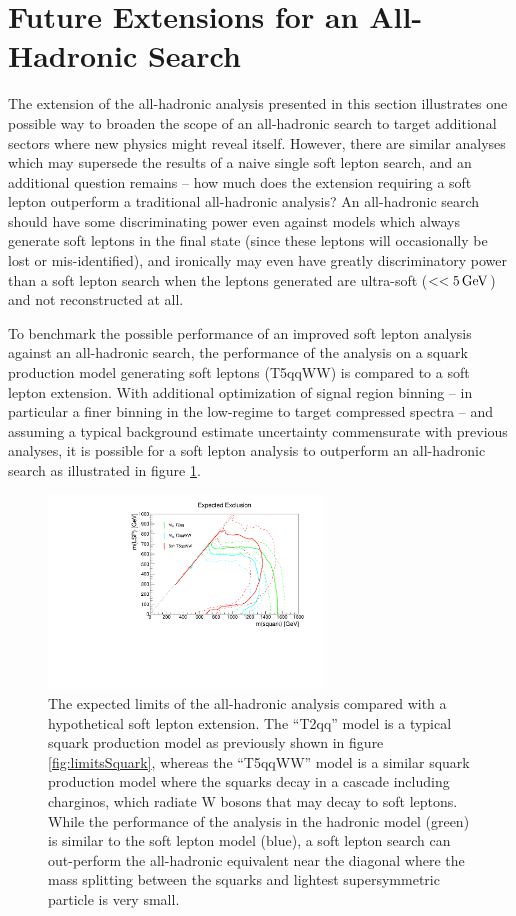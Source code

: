 \section{Future Extensions for an All-Hadronic Search}
\label{sec:future}

The extension of the all-hadronic analysis presented in this section illustrates one possible way to broaden the scope of an all-hadronic search to target additional sectors where new physics might reveal itself. However, there are similar analyses which may supersede the results of a naive single soft lepton search, and an additional question remains -- how much does the extension requiring a soft lepton outperform a traditional all-hadronic analysis? An all-hadronic search should have some discriminating power even against models which always generate soft leptons in the final state (since these leptons will occasionally be lost or mis-identified), and ironically may even have greatly discriminatory power than a soft lepton search when the leptons generated are ultra-soft (\pt $<<5\,\text{Ge\hspace{-.08em}V}$) and not reconstructed at all.

To benchmark the possible performance of an improved soft lepton analysis against an all-hadronic search, the performance of the \mttwo analysis on a squark production model generating soft leptons (T5qqWW) is compared to a soft lepton extension. With additional optimization of signal region binning -- in particular a finer binning in the low-\MET regime to target compressed spectra -- and assuming a typical background estimate uncertainty commensurate with previous analyses, it is possible for a soft lepton analysis to outperform an all-hadronic search as illustrated in figure \ref{fig:softfuture}. 
\begin{figure}
	\centering
	\includegraphics[width=0.65\textwidth]{soft/figs/expectedSoftLimit.pdf}
	\caption{The expected limits of the all-hadronic \mttwo analysis compared with a hypothetical soft lepton extension. The ``T2qq'' model is a typical squark production model as previously shown in figure \ref{fig:limitsSquark}, whereas the ``T5qqWW'' model is a similar squark production model where the squarks decay in a cascade including charginos, which radiate W bosons that may decay to soft leptons. While the performance of the \mttwo analysis in the hadronic model (green) is similar to the soft lepton model (blue), a soft lepton search can out-perform the all-hadronic equivalent near the diagonal where the mass splitting between the squarks and lightest supersymmetric particle is very small.}
	\label{fig:softfuture}
\end{figure}

